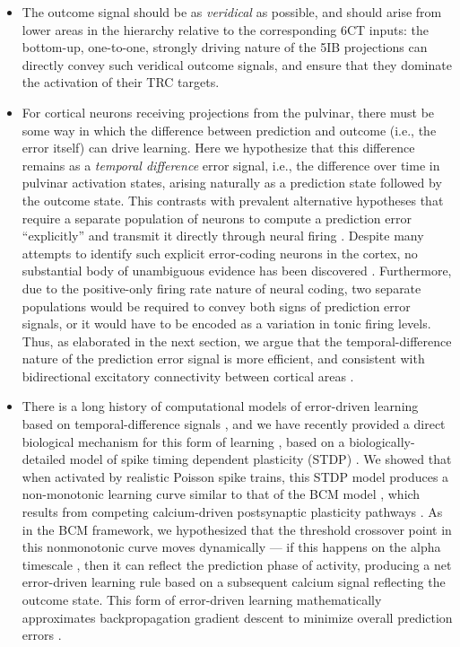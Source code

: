 \documentclass[11pt,twoside]{article}
\newif\myifpdf
\begin{document}
\begin{itemize}
	\item The outcome signal should be as \emph{veridical} as possible, and should arise from lower areas in the hierarchy relative to the corresponding 6CT inputs: the bottom-up, one-to-one, strongly driving nature of the 5IB projections can directly convey such veridical outcome signals, and ensure that they dominate the activation of their TRC targets.
	\item For cortical neurons receiving projections from the pulvinar, there must be some way in which the difference between prediction and outcome (i.e., the error itself) can drive learning.  Here we hypothesize that this difference remains as a \emph{temporal difference} error signal, i.e., the difference over time in pulvinar activation states, arising naturally as a prediction state followed by the outcome state.  This contrasts with prevalent alternative hypotheses that require a separate population of neurons to compute a prediction error ``explicitly'' and transmit it directly through neural firing \cite{RaoBallard99,KawatoHayakawaInui93,Friston05,Friston10,OudenKokLange12,LotterKreimanCox16}.  Despite many attempts to identify such explicit error-coding neurons in the cortex, no substantial body of unambiguous evidence has been discovered \cite{KokLange15,KokJeheedeLange12,SummerfieldEgner09,LeeMumford03,WalshMcGovernClarkEtAl20}.  Furthermore, due to the positive-only firing rate nature of neural coding, two separate populations would be required to convey both signs of prediction error signals, or it would have to be encoded as a variation in tonic firing levels.  Thus, as elaborated in the next section, we argue that the temporal-difference nature of the prediction error signal is more efficient, and consistent with bidirectional excitatory connectivity between cortical areas \cite{RumelhartMcClelland82,Hopfield84,DesimoneDuncan95,ReynoldsChelazziDesimone99,MillerCohen01,OReillyWyatteHerdEtAl13}.  
	\item There is a long history of computational models of error-driven learning based on temporal-difference signals \cite{AckleyHintonSejnowski85,OReilly96,BengioMesnardFischerEtAl17,WhittingtonBogacz19,LillicrapSantoroMarrisEtAl20}, and we have recently provided a direct biological mechanism for this form of learning \cite{OReillyMunakataFrankEtAl12}, based on a biologically-detailed model of spike timing dependent plasticity (STDP) \cite{UrakuboHondaFroemkeEtAl08}.  We showed that when activated by realistic Poisson spike trains, this STDP model produces a non-monotonic learning curve similar to that of the BCM model \cite{BienenstockCooperMunro82}, which results from competing calcium-driven postsynaptic plasticity pathways \cite{ShouvalBearCooper02,CooperBear12}.  As in the BCM framework, we hypothesized that the threshold crossover point in this nonmonotonic curve moves dynamically --- if this happens on the alpha timescale \cite{LimMcKeeWoloszynEtAl15}, then it can reflect the prediction phase of activity, producing a net error-driven learning rule based on a subsequent calcium signal reflecting the outcome state.  This form of error-driven learning mathematically approximates backpropagation gradient descent to minimize overall prediction errors \cite{OReilly96}.

\end{itemize}
\end{document}
